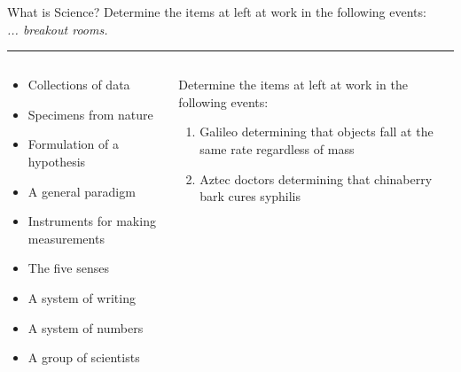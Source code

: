 \documentclass{beamer}
\begin{document}
\begin{frame}{What is Science?}
\small
Determine the items at left at work in the following events: \\ \textit{... breakout rooms.}
\rule{10cm}{0.05cm}
\begin{columns}
\begin{column}{0.65\textwidth}
\begin{itemize}
\item Collections of data
\item Specimens from nature
\item Formulation of a hypothesis
\item A general paradigm
\item Instruments for making measurements
\item The five senses
\item A system of writing
\item A system of numbers
\item A group of scientists
\end{itemize}
\end{column}
\begin{column}{0.35\textwidth}
Determine the items at left at work in the following events:
\begin{enumerate}
\item Galileo determining that objects fall at the same rate regardless of mass
\item Aztec doctors determining that chinaberry bark cures syphilis
\end{enumerate}
\end{column}
\end{columns}
\end{frame}
\end{document}
